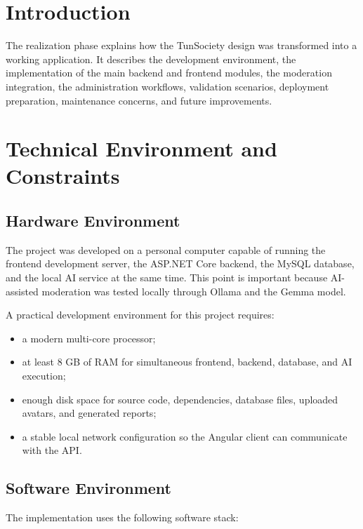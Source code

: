 \section{Introduction}

The realization phase explains how the TunSociety design was transformed into a working application. It describes the development environment, the implementation of the main backend and frontend modules, the moderation integration, the administration workflows, validation scenarios, deployment preparation, maintenance concerns, and future improvements.

\section{Technical Environment and Constraints}

\subsection{Hardware Environment}

The project was developed on a personal computer capable of running the frontend development server, the ASP.NET Core backend, the MySQL database, and the local AI service at the same time. This point is important because AI-assisted moderation was tested locally through Ollama and the Gemma model.

A practical development environment for this project requires:

\begin{itemize}
    \item a modern multi-core processor;
    \item at least 8 GB of RAM for simultaneous frontend, backend, database, and AI execution;
    \item enough disk space for source code, dependencies, database files, uploaded avatars, and generated reports;
    \item a stable local network configuration so the Angular client can communicate with the API.
\end{itemize}

\subsection{Software Environment}

The implementation uses the following software stack:

